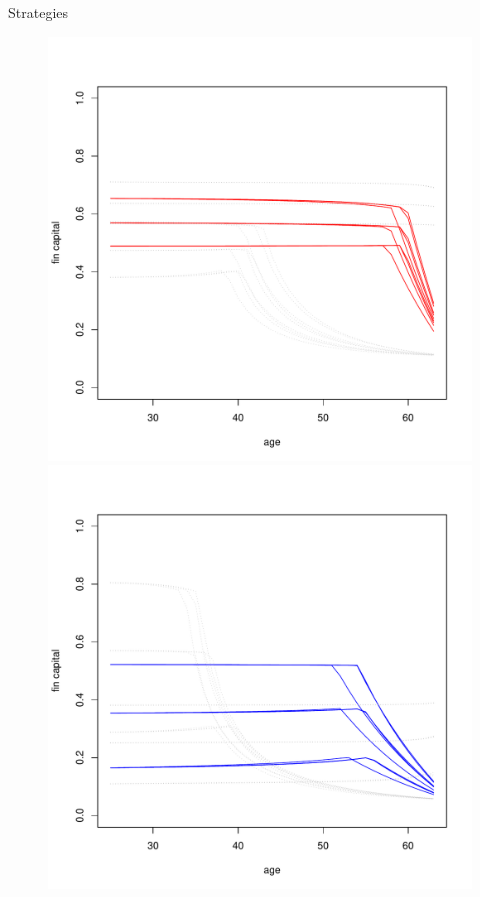 \documentclass{beamer}
\begin{document}
\begin{frame}[allowframebreaks]{Strategies}
\begin{itemize}
\begin{figure}[H]
		\includegraphics[scale=0.25]{figs/hmunkhouse5.pdf}
		\includegraphics[scale=0.25]{figs/smunkhouse10.pdf}

\end{figure}
\end{itemize}
\end{frame}
\end{document}
